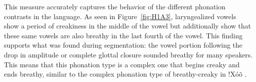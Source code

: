 \documentclass[12pt, letterpaper]{article}
\begin{document}
This measure accurately captures the behavior of the different phonation contrasts in the language. As seen in Figure~\ref{fig:H1A3}, laryngealized vowels show a period of creakiness in the middle of the vowel but additionally show that these same vowels are also breathy in the last fourth of the vowel. This finding supports what was found during segmentation: the vowel portion following the drop in amplitude or complete glottal closure sounded breathy for many speakers. This means that this phonation type is a complex one that begins creaky and ends breathy, similar to the complex phonation type of breathy-creaky in !Xóõ \citep{garellekAcousticDiscriminabilityComplex2020}.



\end{document}
